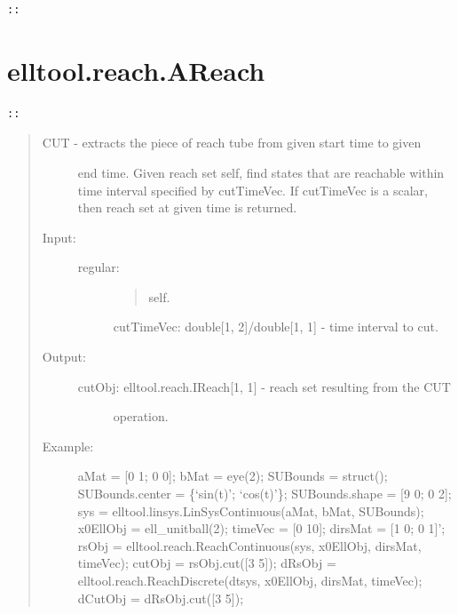 \documentclass[letterpaper,10pt,english]{sphinxmanual}
\begin{document}
\begin{Verbatim}[commandchars=\\\{\}]
::
\end{Verbatim}


\section{elltool.reach.AReach}
\label{chap_func:elltool-reach-areach}
\begin{Verbatim}[commandchars=\\\{\}]
::
\end{Verbatim}
\begin{quote}
\begin{description}
\item[{CUT - extracts the piece of reach tube from given start time to given}] \leavevmode
end time. Given reach set self, find states that are reachable
within time interval specified by cutTimeVec. If cutTimeVec
is a scalar, then reach set at given time is returned.

\item[{Input:}] \leavevmode\begin{description}
\item[{regular:}] \leavevmode\begin{quote}

self.
\end{quote}

cutTimeVec: double{[}1, 2{]}/double{[}1, 1{]} - time interval to cut.

\end{description}

\item[{Output:}] \leavevmode\begin{description}
\item[{cutObj: elltool.reach.IReach{[}1, 1{]} - reach set resulting from the CUT}] \leavevmode
operation.

\end{description}

\item[{Example:}] \leavevmode
aMat = {[}0 1; 0 0{]}; bMat = eye(2);
SUBounds = struct();
SUBounds.center = \{`sin(t)'; `cos(t)'\};
SUBounds.shape = {[}9 0; 0 2{]};
sys = elltool.linsys.LinSysContinuous(aMat, bMat, SUBounds);
x0EllObj = ell\_unitball(2);
timeVec = {[}0 10{]};
dirsMat = {[}1 0; 0 1{]}';
rsObj = elltool.reach.ReachContinuous(sys, x0EllObj, dirsMat, timeVec);
cutObj = rsObj.cut({[}3 5{]});
dRsObj = elltool.reach.ReachDiscrete(dtsys, x0EllObj, dirsMat, timeVec);
dCutObj = dRsObj.cut({[}3 5{]});

\end{description}
\end{quote}
\end{document}
